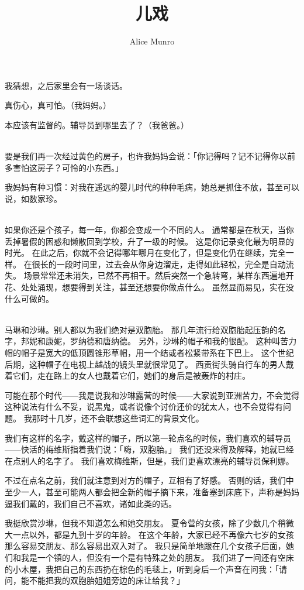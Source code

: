 \documentclass[UTF8]{ctexart}
\title{儿戏}
\author{Alice Munro}
\date{}
\begin{document}
\maketitle

\newpage
我猜想，之后家里会有一场谈话。

真伤心，真可怕。（我妈妈。）

本应该有监督的。辅导员到哪里去了？（我爸爸。）

~\\

要是我们再一次经过黄色的房子，也许我妈妈会说：「你记得吗？记不记得你以前多害怕这房子？可怜的小东西。」

我妈妈有种习惯：对我在遥远的婴儿时代的种种毛病，她总是抓住不放，甚至可以说，如数家珍。

~\\

如果你还是个孩子，每一年，你都会变成一个不同的人。
通常都是在秋天，当你丢掉暑假的困惑和懒散回到学校，升了一级的时候。
这是你记录变化最为明显的时光。
在此之后，你就不会记得哪年哪月在变化了，但是变化仍在继续，完全一样。
在很长的一段时间里，过去会从你身边溜走，走得如此轻松，完全是自动流失。
场景常常还未消失，已然不再相干。然后突然一个急转弯，某样东西遍地开花、处处涌现，想要得到关注，甚至还想要你做点什么。
虽然显而易见，实在没什么可做的。

~\\

马琳和沙琳。别人都以为我们绝对是双胞胎。
那几年流行给双胞胎起压韵的名字，邦妮和康妮，罗纳德和唐纳德。
另外，沙琳的帽子和我的很配。
这种叫苦力帽的帽子是宽大的低顶圆锥形草帽，用一个结或者松紧带系在下巴上。
这个世纪后期，这种帽子在电视上越战的镜头里就很常见了。
西贡街头骑自行车的男人戴着它们，走在路上的女人也戴着它们，她们的身后是被轰炸的村庄。

可能在那个时代——我是说我和沙琳露营的时候——大家说到亚洲苦力，不会觉得这种说法有什么不妥，说黑鬼，或者说像个讨价还价的犹太人，也不会觉得有问题。
我那时十几岁，还不会联想这些词汇的背景文化。

我们有这样的名字，戴这样的帽子，所以第一轮点名的时候，我们喜欢的辅导员——快活的梅维斯指着我们说：「嗨，双胞胎。」
我们还没来得及解释，她就已经在点别人的名字了。
我们喜欢梅维斯，但是，我们更喜欢漂亮的辅导员保利娜。

不过在点名之前，我们就注意到对方的帽子，互相有了好感。
否则的话，我们中至少一人，甚至可能两人都会把全新的帽子摘下来，准备塞到床底下，声称是妈妈逼我们戴的，我们自己不喜欢，诸如此类的话。

我挺欣赏沙琳，但我不知道怎么和她交朋友。
夏令营的女孩，除了少数几个稍微大一点以外，都是九到十岁的年龄。
在这个年龄，大家已经不再像六七岁的女孩那么容易交朋友、那么容易出双入对了。
我只是简单地跟在几个女孩子后面，她们和我是一个镇的人，但没有一个是有特殊之处的朋友。
我们进了一间还有空床的小木屋，我把自己的东西扔在棕色的毛毯上，听到身后一个声音在问我：「请问，能不能把我的双胞胎姐姐旁边的床让给我？」
\end{document}
